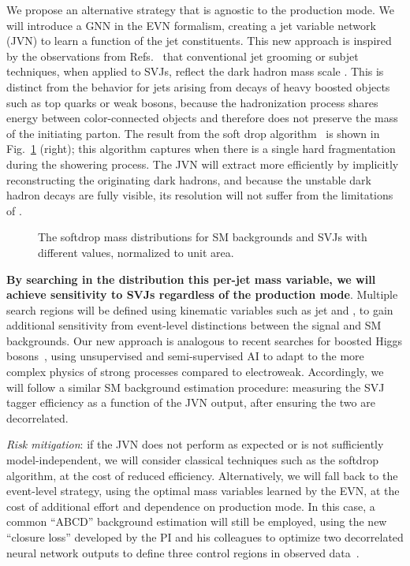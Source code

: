We propose an alternative strategy that is agnostic to the production mode.
We will introduce a GNN in the EVN formalism, creating a jet variable network (JVN) to learn a function of the jet constituents.
This new approach is inspired by the observations from Refs.~\cite{Strassler:2008fv,CMS:2021dzg} that conventional jet grooming or subjet techniques, when applied to SVJs, reflect the dark hadron mass scale \mdark.
This is distinct from the behavior for jets arising from decays of heavy boosted objects such as top quarks or weak bosons,
because the hadronization process shares energy between color-connected objects and therefore does not preserve the mass of the initiating parton.
The result from the soft drop algorithm~\cite{Larkoski:2014wba} is shown in Fig.~\ref{fig:svjmass} (right); this algorithm captures \mdark when there is a single hard fragmentation during the showering process.
The JVN will extract \mdark more efficiently by implicitly reconstructing the originating dark hadrons,
and because the unstable dark hadron decays are fully visible, its resolution will not suffer from the limitations of \ptmiss.

\begin{figure}[htb!]
\centering
{}
\caption{The softdrop mass distributions for SM backgrounds and SVJs with different \mdark values, normalized to unit area.}
\label{fig:svjmass}
\end{figure}

\textbf{By searching in the distribution this per-jet mass variable, we will achieve sensitivity to SVJs regardless of the production mode}.
Multiple search regions will be defined using kinematic variables such as jet \pt and \ptmiss,
to gain additional sensitivity from event-level distinctions between the signal and SM backgrounds.
Our new approach is analogous to recent searches for boosted Higgs bosons~\cite{CMS:2020zge},
using unsupervised and semi-supervised AI to adapt to the more complex physics of strong processes compared to electroweak.
Accordingly, we will follow a similar SM background estimation procedure:
measuring the SVJ tagger efficiency as a function of the JVN output, after ensuring the two are decorrelated.

\textit{Risk mitigation}: if the JVN does not perform as expected or is not sufficiently model-independent, we will consider classical techniques such as the softdrop algorithm, at the cost of reduced efficiency.
Alternatively, we will fall back to the event-level strategy, using the optimal mass variables learned by the EVN, at the cost of additional effort and dependence on production mode.
In this case, a common ``ABCD'' background estimation will still be employed, using the new ``closure loss'' developed by the PI and his colleagues
to optimize two decorrelated neural network outputs to define three control regions in observed data~\cite{Crossman:2023aps}.


